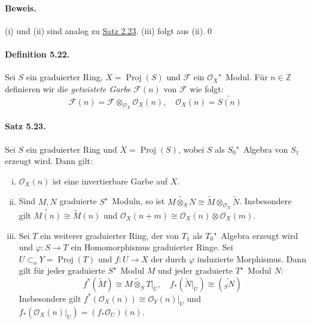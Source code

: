 \paragraph{Beweis.} (i) und (ii) sind analog zu \hyperref[2.23]{Satz 2.23}. (iii) folgt aus (ii).\qed

\paragraph{Definition 5.22.}\label{5.22} Sei $S$ ein graduierter Ring, $X=\operatorname{Proj}(S)$ und $\mathcal{F}$ ein $\mathcal{O}_X$"~Modul. Für $n\in\mathbb{Z}$ definieren wir die \textit{getwistete Garbe} $\mathcal{F}(n)$ von $\mathcal{F}$ wie folgt:
\[\mathcal{F}(n)=\mathcal{F}\otimes_{\mathcal{O}_X}\mathcal{O}_X(n),\quad \mathcal{O}_X(n)=\widetilde{S(n)} \]

\paragraph{Satz 5.23.}\label{5.23} Sei $S$ ein graduierter Ring und $X=\operatorname{Proj}(S)$, wobei $S$ als $S_0$"~Algebra von $S_1$ erzeugt wird. Dann gilt:
\begin{enumerate}[(i)]
\item $\mathcal{O}_X(n)$ ist eine invertierbare Garbe auf $X$.
\item Sind $M,N$ graduierte $S$"~Moduln, so ist $\widetilde{M\otimes_SN}\cong\widetilde{M}\otimes_{\mathcal{O}_X}\widetilde{N}$. Insbesondere gilt $\widetilde{M(n)}\cong\widetilde{M}(n)$ und $\mathcal{O}_X(n+m)\cong\mathcal{O}_X(n)\otimes\mathcal{O}_X(m)$.
\item Sei $T$ ein weiterer graduierter Ring, der von $T_1$ als $T_0$"~Algebra erzeugt wird und $\varphi:S\to T$ ein Homomorphismus graduierter Ringe. Sei $U\subset_\text{o} Y=\operatorname{Proj}(T)$ und $f:U\to X$ der durch $\varphi$ induzierte Morphismus. Dann gilt für jeder graduierte $S$"~Modul $M$ und jeder graduierte $T$"~Modul $N$:
\[f^\ast(\widetilde{M})\cong\widetilde{M\otimes_ST}|_U,\quad f_\ast(\widetilde{N}|_U)\cong (\widetilde{_SN}) \]
Insbesondere gilt $f^\ast(\mathcal{O}_X(n))\cong\mathcal{O}_Y(n)|_U$ und $f_\ast(\mathcal{O}_X(n)|_U)=(f_\ast\mathcal{O}_U)(n)$.
\end{enumerate}

